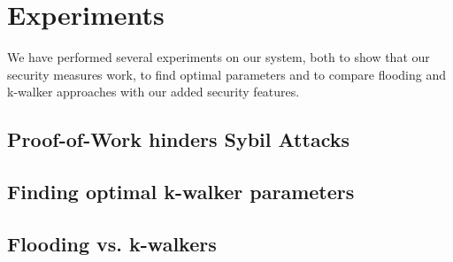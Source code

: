 \section{Experiments}
We have performed several experiments on our system, both to show that our security measures work, to find optimal parameters and to compare flooding and k-walker approaches with our added security features.

\subsection{Proof-of-Work hinders Sybil Attacks}

\subsection{Finding optimal k-walker parameters}



\subsection{Flooding vs. k-walkers}

